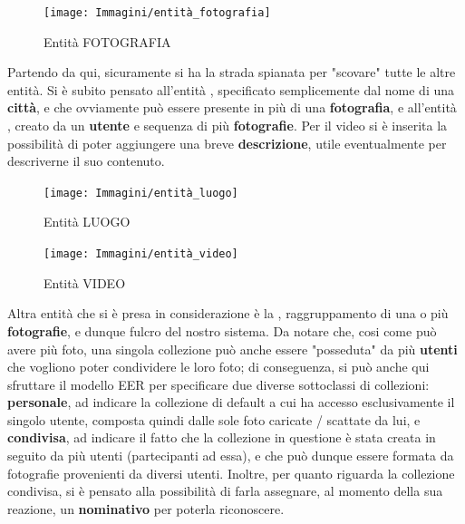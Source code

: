 \documentclass[a4paper]{article}
\begin{document}
	\begin{figure}[H]
        \begin{center}
            \texttt{[image: Immagini/entità\_fotografia]}
            \caption{Entità FOTOGRAFIA}
        \end{center}
	\end{figure}

	\vspace{10pt}
	Partendo da qui, sicuramente si ha la strada spianata
	per "scovare" 
	tutte le altre entità. Si è subito
	pensato
	all'entità , specificato
	semplicemente dal
	nome di una \textbf{città}, e
	che ovviamente può essere presente in più di una
	\textbf{fotografia}, e all'entità
	,
	creato da un \textbf{utente} e
	sequenza di più \textbf{fotografie}. Per il video si è
	inserita la possibilità di poter aggiungere una breve
	\textbf{descrizione}, utile eventualmente per descriverne
	il suo contenuto.

	\begin{figure}[H]
        \begin{center}
            \texttt{[image: Immagini/entità\_luogo]}
            \caption{Entità LUOGO}
        \end{center}
	\end{figure}
	
	\vspace{8pt}

	\begin{figure}[H]
        \begin{center}
            \texttt{[image: Immagini/entità\_video]}
        \caption{Entità VIDEO}
        \end{center}
	\end{figure}

	\vspace{9pt}
	Altra entità che si è presa in
	considerazione è la ,
	raggruppamento di una o
	più \textbf{fotografie}, e
	dunque fulcro del nostro sistema. Da notare che, cosi
	come può avere più foto, una singola collezione può
	anche essere "posseduta" da più \textbf{utenti} che
	vogliono poter
	condividere le loro foto; di conseguenza, si può anche 
	qui sfruttare il modello EER per specificare due diverse
	sottoclassi di collezioni: \textbf{personale}, ad
	indicare la collezione di default a cui ha accesso
	esclusivamente il singolo 		
	utente, composta quindi dalle sole foto caricate /
	scattate da lui, e \textbf{condivisa}, ad indicare il
	fatto che la collezione in questione è stata creata in
	seguito da più utenti
	(partecipanti ad essa), e che può dunque essere formata
	da fotografie provenienti da diversi utenti. Inoltre, per
	quanto riguarda la collezione
	condivisa, si è pensato alla possibilità di farla
	assegnare, al momento della sua reazione, un
	\textbf{nominativo}
	per poterla riconoscere. 
\end{document}
